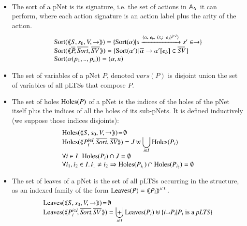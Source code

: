 \documentclass{elsarticle}
\newcommand{\TODO}[1]{\textcolor{red}{\textbf{[TODO:#1]}}}
\begin{document}
\begin{definition}\label{def-sortholeleave}~~

  \begin{itemize}
  \item The sort of a pNet is its signature, i.e. the set of actions in $\mathbb{A}_S$ it can
perform, where each action signature is an action 
label plus the arity of the action.
\[
\begin{array}{l}
\Sortop(\mylangle S,s_0,V, \to\myrangle) = \{\Sortop(\alpha)|s \xrightarrow{\langle \alpha,~e_b,~(x_j\!:= {e}_j)^{j\in
    J}\rangle} s'\in \to \} \\
\Sortop(\mylangle \set{\pNet}\!, %
\set{\Sort},
\set{\symb{SV}\,}\myrangle)
=\{\Sortop(\alpha') |\, \SV{\set{\alpha}}{\alpha'}{e_b}\in\set{\symb{SV}}\,\}\\
\Sortop(\alpha(p_1,..,p_n))=(\alpha,n)
\end{array}
\]

\item The set of variables of a pNet $P$, denoted $vars(P)$ is disjoint union the set of variables of  all pLTSs that compose $P$.

\item
The set of holes $\operatorname{Holes}(P)$ of a pNet is the indices of the holes of the pNet 
itself plus the indices of all the holes of its sub-pNets.
It is defined inductively (we suppose those indices 
disjoints):
  \[\begin{array}{l}
\Holes(\mylangle S,s_0,V, \to\myrangle) \!=\! \emptyset\\
\Holes(\mylangle \pNet_i^{i\in I}\!,\set{\Sort}, \set{\symb{SV}}\myrangle) 
=J\uplus{\displaystyle \bigcup_{i\in 
I}\Holes(\pNet_i)}\\
\forall i\in I.\, \Holes(\pNet_i)\cap J=\emptyset\\
\forall i_1,i_2\in I.\,i_1\neq i_2\Rightarrow  \Holes(\pNet_{i_1})\cap\Holes(\pNet_{i_2})=\emptyset
\end{array}\]

\item
The set of leaves of a pNet is the set of all pLTSs occurring in the structure, as an 
indexed family of the form $\operatorname{Leaves}(P)= \langle\hspace{-0.45ex}\langle P_i \rangle\hspace{-0.45ex}\rangle^{i \in L}$.
\[\begin{array}{l}
\Leaves(\mylangle S,s_0,V, \to\myrangle) \!=\!\emptyset\\%
\Leaves(\mylangle \pNet_i^{i\in I}\!,%
\set{\Sort}\!, \set{\symb{SV}\,}\myrangle) = {\displaystyle \biguplus_{i\in 
I}\Leaves(\pNet_i)\uplus\{i\mapsto \pNet_i|\pNet_i \text{ is a }\pLTS\}}
\end{array}\]
\end{itemize}


\end{definition}
\end{document}
